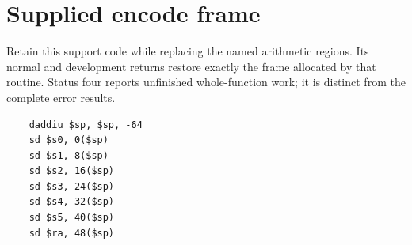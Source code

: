 \section{Supplied encode frame}
Retain this support code while replacing the named arithmetic regions. Its normal and development returns restore exactly the frame allocated by that routine. Status four reports unfinished whole-function work; it is distinct from the complete error results.

\begin{verbatim}
    daddiu $sp, $sp, -64
    sd $s0, 0($sp)
    sd $s1, 8($sp)
    sd $s2, 16($sp)
    sd $s3, 24($sp)
    sd $s4, 32($sp)
    sd $s5, 40($sp)
    sd $ra, 48($sp)
\end{verbatim}
